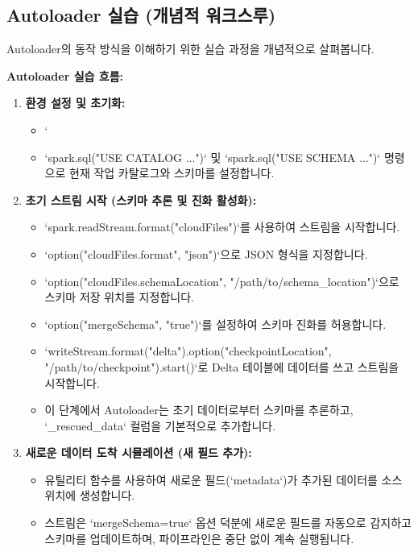 \documentclass[11pt,a4paper]{article}
\begin{document}
\subsection{Autoloader 실습 (개념적 워크스루)}
Autoloader의 동작 방식을 이해하기 위한 실습 과정을 개념적으로 살펴봅니다.

\begin{examplebox}
\textbf{Autoloader 실습 흐름:}
\begin{enumerate}
    \item \textbf{환경 설정 및 초기화:}
    \begin{itemize}
        \item `%
        \item `spark.sql("USE CATALOG ...")` 및 `spark.sql("USE SCHEMA ...")` 명령으로 현재 작업 카탈로그와 스키마를 설정합니다.
    \end{itemize}
    \item \textbf{초기 스트림 시작 (스키마 추론 및 진화 활성화):}
    \begin{itemize}
        \item `spark.readStream.format("cloudFiles")`를 사용하여 스트림을 시작합니다.
        \item `option("cloudFiles.format", "json")`으로 JSON 형식을 지정합니다.
        \item `option("cloudFiles.schemaLocation", "/path/to/schema_location")`으로 스키마 저장 위치를 지정합니다.
        \item `option("mergeSchema", "true")`를 설정하여 스키마 진화를 허용합니다.
        \item `writeStream.format("delta").option("checkpointLocation", "/path/to/checkpoint").start()`로 Delta 테이블에 데이터를 쓰고 스트림을 시작합니다.
        \item 이 단계에서 Autoloader는 초기 데이터로부터 스키마를 추론하고, `_rescued_data` 컬럼을 기본적으로 추가합니다.
    \end{itemize}
    \item \textbf{새로운 데이터 도착 시뮬레이션 (새 필드 추가):}
    \begin{itemize}
        \item 유틸리티 함수를 사용하여 새로운 필드(`metadata`)가 추가된 데이터를 소스 위치에 생성합니다.
        \item 스트림은 `mergeSchema=true` 옵션 덕분에 새로운 필드를 자동으로 감지하고 스키마를 업데이트하며, 파이프라인은 중단 없이 계속 실행됩니다.

\end{itemize}
\end{enumerate}
\end{examplebox}
\end{document}
